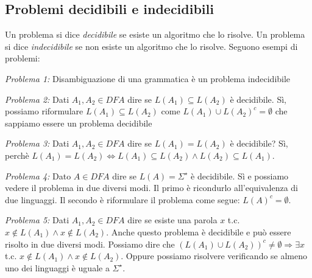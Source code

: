 \subsection{Problemi decidibili e indecidibili}
Un problema si dice \emph{decidibile} se esiste un algoritmo che lo risolve.\newline
Un problema si dice \emph{indecidibile} se non esiste un algoritmo che lo risolve. \newline
Seguono esempi di problemi:
\begin{description}
	\item \emph{Problema 1:} Disambiguazione di una grammatica \`e un problema indecidibile
	\item \emph{Problema 2:} Dati $A_1, A_2 \in DFA$ dire se $L(A_1) \subseteq L(A_2)$ \`e decidibile. S\`i, possiamo riformulare $L(A_1) \subseteq L(A_2)$ come $L(A_1) \cup L(A_2)^c = \emptyset$ che sappiamo essere un problema decidibile
	\item \emph{Problema 3:} Dati $A_1, A_2 \in DFA$ dire se $L(A_1) = L(A_2)$ \`e decidibile? S\`i, perch\`e $L(A_1) = L(A_2) \Leftrightarrow L(A_1) \subseteq L(A_2) \land L(A_2) \subseteq L(A_1)$. 
	\item \emph{Problema 4:} Dato $A \in DFA$ dire se $L(A) = \Sigma^{\star}$ \`e decidibile. S\`i e possiamo vedere il problema in due diversi modi. Il primo \`e ricondurlo all'equivalenza di due linguaggi. Il secondo \`e riformulare il problema come segue: $L(A)^c = \emptyset$.
	\item \emph{Problema 5:} Dati $A_1, A_2 \in DFA$ dire se esiste una parola $x$ t.c. $x \notin L(A_1) \land x \notin L(A_2)$. Anche questo problema \`e decidibile e pu\`o essere risolto in due diversi modi. Possiamo dire che $(L(A_1) \cup L(A_2))^c \neq \emptyset \Rightarrow \exists x$ t.c. $x \notin L(A_1) \land x \notin L(A_2)$. Oppure possiamo risolvere verificando se almeno uno dei linguaggi \`e uguale a $\Sigma^{\star}$.
\end{description}
